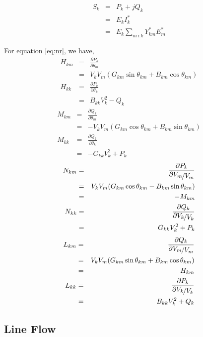 \documentclass[a4paper,11pt]{article}
\begin{document}
\begin{eqnarray}
S_{k} & = & P_{k} + jQ_{k} \nonumber \\
	& = & E_{k}I_{k}^{\ast} \\
	& = & E_{k} \sum_{m\, \epsilon\, k} Y_{km}^{\ast}E_{m}^{\ast} \nonumber
\end{eqnarray}

For equation \ref{eq:nr}, we have,
\begin{eqnarray*}
H_{km} &=& \frac{\partial P_{k}}{\partial \theta_{m}} \\
	&=& V_{k}V_{m}(G_{km}\sin \theta_{km} + B_{km}\cos \theta_{km}) \\
H_{kk} &=& \frac{\partial P_{k}}{\partial \theta_{k}} \\
	&=& B_{kk}V_{k}^{2} - Q_{k} 
\end{eqnarray*}
\begin{eqnarray*}
M_{km} &=& \frac{\partial Q_{k}}{\partial \theta_{m}} \\
	&=& -V_{k}V_{m}(G_{km}\cos \theta_{km} + B_{km}\sin \theta_{km}) \\
M_{kk} &=& \frac{\partial Q_{k}}{\partial \theta_{k}} \\
	&=& -G_{kk}V_{k}^{2} + P_{k} 
\end{eqnarray*}
\begin{eqnarray}
N_{km} &=& \frac{\partial P_{k}}{\nicefrac{\displaystyle{\partial V_{m}}}{\displaystyle{V_{m}}}} \nonumber \\
	&=& V_{k}V_{m}(G_{km}\cos \theta_{km} - B_{km}\sin \theta_{km}) \nonumber \\
	&=& -M_{km} \\
N_{kk} &=& \frac{\partial Q_{k}}{\nicefrac{\displaystyle{\partial V_{k}}}{\displaystyle{V_{k}}}} \nonumber \\
	&=& G_{kk}V_{k}^{2} + P_{k} \nonumber
\end{eqnarray}
\begin{eqnarray*}
L_{km} &=& \frac{\partial Q_{k}}{\nicefrac{\displaystyle{\partial V_{m}}}{\displaystyle{V_{m}}}} \\
	&=& V_{k}V_{m}(G_{km}\sin \theta_{km} + B_{km}\cos \theta_{km}) \\
	&=& H_{km} \\ 
L_{kk} &=& \frac{\partial P_{k}}{\nicefrac{\displaystyle{\partial V_{k}}}{\displaystyle{V_{k}}}} \\
	&=& B_{kk}V_{k}^{2} + Q_{k} 
\end{eqnarray*}

\subsection{Line Flow}
\end{document}
